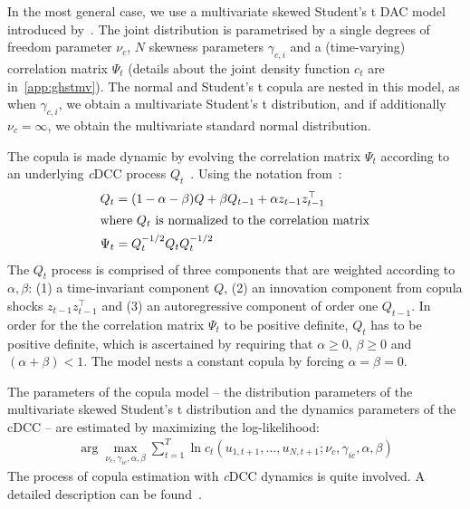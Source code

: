 In the most general case, we use a multivariate skewed Student's t DAC model introduced by~\autocite{ChristoffersenErrunzaJacobLanglois2012}. The joint distribution is parametrised by a single degrees of freedom parameter $\nu_c$, $N$ skewness parameters $\gamma_{c,i}$ and a (time-varying) correlation matrix $\Psi_{t}$ (details about the joint density function $c_t$ are in~\autoref{app:ghstmv}). The normal and Student's t copula are nested in this model, as when $\gamma_{c,i}$, we obtain a multivariate Student's t distribution, and if additionally $\nu_c = \infty$, we obtain the multivariate standard normal distribution.


The copula is made dynamic by evolving the correlation matrix $\Psi_t$ according to an underlying \emph{c}DCC process $Q_t$~\autocites[cf.]{Engle2002,Aielli2013}. Using the notation from~\autocite{ChristoffersenLanglois2013}:
\begin{align}
  Q_t &= (1 - \alpha - \beta) Q
    + \beta Q_{t - 1}
    + \alpha z_{t - 1} z_{t - 1}^\top \\
  \intertext{where $Q_t$ is normalized to the correlation matrix}
  \Psi_t &= Q_t^{-1/2} Q_t Q_t^{-1/2}
\end{align}
The $Q_t$ process is comprised of three components that are weighted according to $\alpha, \beta$: (1) a time-invariant component $Q$, (2) an innovation component from copula shocks $z_{t-1} z_{t-1}^\top$ and (3) an autoregressive component of order one $Q_{t-1}$. In order for the the correlation matrix $\Psi_t$ to be positive definite, $Q_t$ has to be positive definite, which is ascertained by requiring that $\alpha \geq 0$, $\beta \geq 0$ and $(\alpha + \beta) < 1$. The model nests a constant copula by forcing $\alpha = \beta = 0$.


The parameters of the copula model -- the distribution parameters of the multivariate skewed Student's t distribution and the dynamics parameters of the cDCC -- are estimated by maximizing the log-likelihood:
\begin{align}
  \arg\!\max_{\nu_c, \gamma_{ic}, \alpha, \beta} \sum_{t = 1}^T \ln c_t(u_{1, t+1}, \ldots, u_{N, t+1}; \nu_c, \gamma_{ic}, \alpha, \beta)
\end{align}
The process of copula estimation with \emph{c}DCC dynamics is quite involved. A detailed description can be found~.



